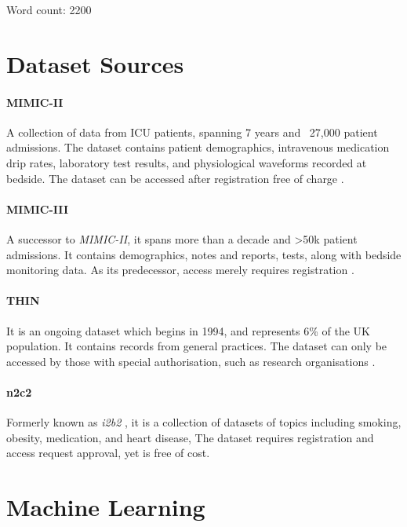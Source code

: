 \documentclass[a4paper,11pt]{article}
\begin{document}
\bigskip
Word count: 2200

\pagebreak
\printbibliography

\pagebreak
\appendix

\section{Dataset Sources}\label{appendix:sources}

\paragraph{MIMIC-II} A collection of data from ICU patients,
spanning 7 years and ~27,000 patient admissions.
The dataset contains patient demographics, intravenous medication drip rates,
laboratory test results, and physiological waveforms recorded at bedside.
The dataset can be accessed after registration free of charge \parencite{Lee2011}.

\paragraph{MIMIC-III} A successor to \textit{MIMIC-II}, it spans more than a
decade and \textgreater 50k patient admissions.
It contains demographics, notes and reports, tests, along with bedside monitoring data.
As its predecessor, access merely requires registration \parencite{Johnson2016}.

\paragraph{THIN} It is an ongoing dataset which begins in 1994, and represents
6\% of the UK population.
It contains records from general practices.
The dataset can only be accessed by those with special authorisation,
such as research organisations \parencite{Lewis2007}.

\paragraph{n2c2} Formerly known as \textit{i2b2} , it is a collection of datasets
of topics including smoking, obesity, medication, and heart disease,
The dataset requires registration and access request approval, yet is free of cost.

\section{Machine Learning}\label{appendix:ml}
\end{document}
